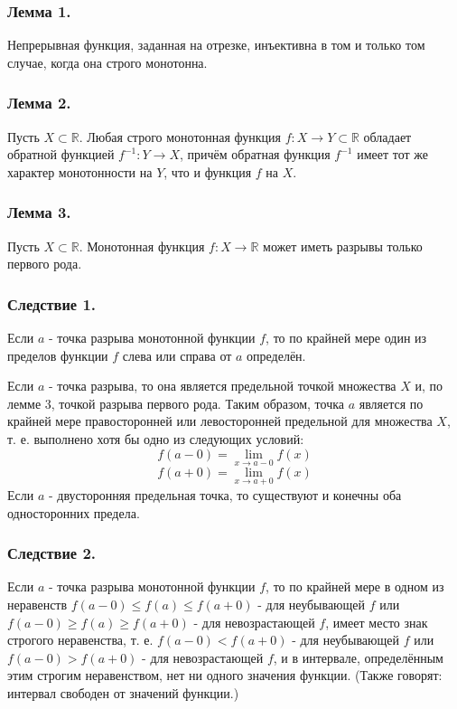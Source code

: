 \subsubsection{Лемма 1.}

Непрерывная функция, заданная на отрезке, инъективна в том и только том случае, когда она строго монотонна.

\subsubsection{Лемма 2.}

Пусть $X \subset \mathbb{R}$.
Любая строго монотонная функция $f:X \to Y \subset \mathbb{R}$ обладает обратной функцией $f^{-1}:Y \to X$,
причём обратная функция $f^{-1}$ имеет тот же характер монотонности на $Y$, что и функция $f$ на $X$.

\subsubsection{Лемма 3.}

Пусть $X \subset \mathbb{R}$.
Монотонная функция $f:X\to \mathbb{R}$ может иметь разрывы только первого рода.

\subsubsection{Следствие 1.}

Если $a$ - точка разрыва монотонной функции $f$, то по крайней мере один из пределов функции $f$ слева или справа от $a$ определён.

\dokvo

Если $a$ - точка разрыва, то она является предельной точкой множества $X$ и, по лемме 3, точкой разрыва первого рода.
Таким образом, точка $a$ является по крайней мере правосторонней или левосторонней предельной для множества $X$, т. е. выполнено хотя бы одно из следующих условий:
\[
f(a-0)=\lim_{x \to a-0}f(x)
\]
\[
f(a+0)=\lim_{x \to a+0}f(x)
\]
Если $a$ - двусторонняя предельная точка, то существуют и конечны оба односторонних предела.

\subsubsection{Следствие 2.}

Если $a$ - точка разрыва монотонной функции $f$, то по крайней мере в одном из неравенств $f(a-0)\leq f(a)\leq f(a+0)$ - для неубывающей $f$ или $f(a-0)\geq f(a)\geq f(a+0)$ - для невозрастающей $f$, имеет место знак строгого неравенства, т. е. $f(a-0) < f(a+0)$ - для неубывающей $f$ или $f(a-0) > f(a+0)$ - для невозрастающей $f$, и в интервале, определённым этим строгим неравенством, нет ни одного значения функции.
(Также говорят: интервал свободен от значений функции.)


